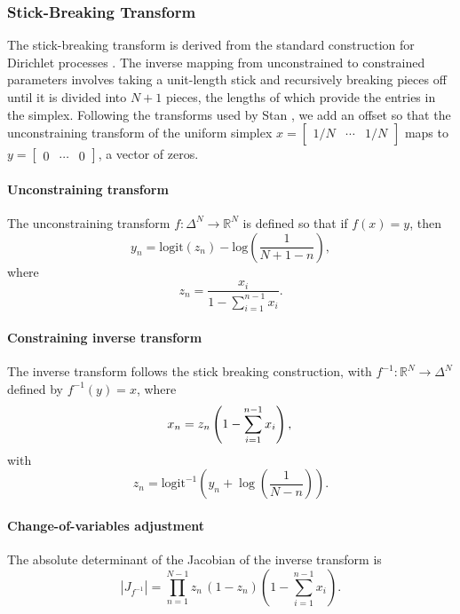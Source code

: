 \documentclass[11pt]{article}
\newcommand{\abs}[1]{\left| #1 \right|}
\begin{document}
\subsubsection{Stick-Breaking Transform}

The stick-breaking transform is derived from the standard construction for Dirichlet processes \cite{sethuraman1994constructive}. The inverse mapping from unconstrained to constrained parameters involves taking a unit-length stick and recursively breaking pieces off until it is divided into $N + 1$ pieces, the lengths of which provide the entries in the simplex.  Following the transforms used by Stan \cite{stan2022ref}, we add an offset so that the unconstraining transform of the uniform simplex $x = \begin{bmatrix} 1/N & \cdots & 1/N \end{bmatrix}$ maps to $y = \begin{bmatrix} 0 & \cdots & 0 \end{bmatrix}$, a vector of zeros.

\paragraph{Unconstraining transform}
The unconstraining transform $f : \Delta^{N} \to  \mathbb{R}^N$ is defined so that if $f(x) = y$, then
\[
y_n
= \mathrm{logit}(z_n)
  - \mbox{log}\left(\frac{1}{N + 1 - n} \right),
\]
where 
\[ 
 z_n = \frac{x_i}{1 - \sum_{i = 1}^{n-1} x_{i}}.
\]

\paragraph{Constraining inverse transform}
The inverse transform follows the stick breaking construction, with $f^{-1} \colon \mathbb{R}^N \to \Delta^N$ defined by $f^{-1}(y) = x$, where
\[
x_n = z_n \left( 1 - \sum_{i=1}^{n-1} x_i \right), \\
\]
with
\[
z_n = \mathrm{logit}^{-1}\!\left(
y_n  + \log \left( \frac{1}{N - n} \right)
\right).
\]
                                            
\paragraph{Change-of-variables adjustment} 
The absolute determinant of the Jacobian of the inverse transform is
\[
\abs{J_{f^{-1}}} 
= \prod_{n=1}^{N-1}
   z_n \, (1 - z_n)
   \left( 1 - \sum_{i=1}^{n-1} x_{i} \right).
\]
\end{document}
